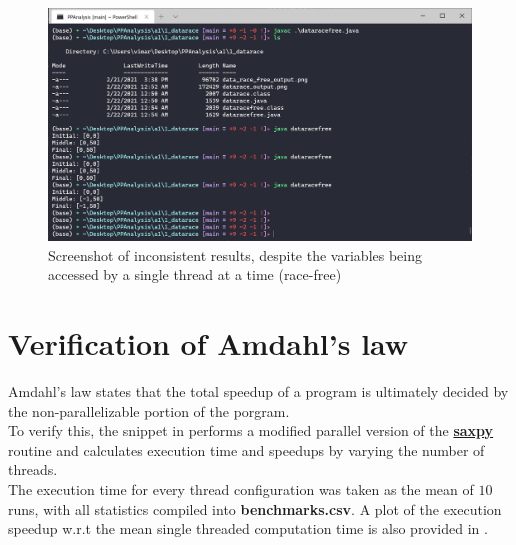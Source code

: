\documentclass{article}
\begin{document}
      
      
      \begin{figure}[h]
        \centering
        \includegraphics[scale=0.7]{1_datarace/dataracefree_output.png}
        \caption{Screenshot of inconsistent results, despite the variables being accessed by a single thread at a time (race-free)}
        \label{fig::12}
      \end{figure}
      
  \section{Verification of Amdahl's law}
    Amdahl's law states that the total speedup of a program is ultimately decided by the non-parallelizable portion of the porgram. \\
    To verify this, the snippet in  performs a modified parallel version of the \href{https://developer.nvidia.com/blog/six-ways-saxpy/}{\textbf{saxpy}} routine and calculates execution time and speedups by varying the number of threads.\\
    The execution time for every thread configuration was taken as the mean of $10$ runs, with all statistics compiled into \textbf{benchmarks.csv}. A plot of the execution speedup w.r.t the mean single threaded computation time is also provided in .

    
\end{document}
